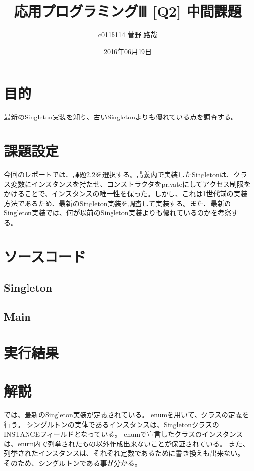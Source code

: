 \documentclass[uplatex]{jsarticle}
\title{応用プログラミングⅢ [Q2] 中間課題}
\author{c0115114 菅野 路哉}
\date{2016年06月19日}
\begin{document}
\maketitle

\section{目的}
最新のSingleton実装を知り、古いSingletonよりも優れている点を調査する。


\section{課題設定}
今回のレポートでは、課題2.2を選択する。講義内で実装したSingletonは、クラス変数にインスタンスを持たせ、コンストラクタをprivateにしてアクセス制限をかけることで、インスタンスの唯一性を保った。しかし、これは1世代前の実装方法であるため、最新のSingleton実装を調査して実装する。また、最新のSingleton実装では、何が以前のSingleton実装よりも優れているのかを考察する。


\section{ソースコード}
\subsection{Singleton}


\newpage
\subsection{Main}


\section{実行結果}


\section{解説}
では、最新のSingleton実装が定義されている。
enumを用いて、クラスの定義を行う。
シングルトンの実体であるインスタンスは、SingletonクラスのINSTANCEフィールドとなっている。
enumで宣言したクラスのインスタンスは、enum内で列挙されたもの以外作成出来ないことが保証されている。
また、列挙されたインスタンスは、それぞれ定数であるために書き換えも出来ない。
そのため、シングルトンである事が分かる。
\end{document}
